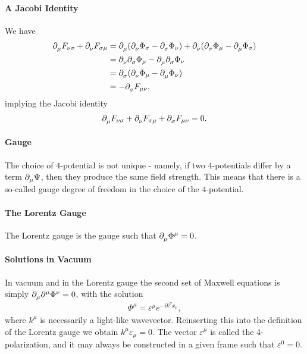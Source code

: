 \paragraph{A Jacobi Identity}
We have
\begin{align*}
	\del{\mu}{F_{\nu\sigma}} + \del{\nu}{F_{\sigma\mu}} &= \del{\mu}{(\del{\nu}{\Phi_{\sigma}} - \del{\sigma}{\Phi_{\nu}})} + \del{\nu}{(\del{\sigma}{\Phi_{\mu}} - \del{\mu}{\Phi_{\sigma}})} \\
	                                                    &= \del{\nu}{\del{\sigma}{\Phi_{\mu}}} - \del{\mu}{\del{\sigma}{\Phi_{\nu}}} \\
	                                                    &= \del{\sigma}{(\del{\nu}{\Phi_{\mu}} - \del{\mu}{\Phi_{\nu}})} \\
	                                                    &= -\del{\sigma}{F_{\mu\nu}},
\end{align*}
implying the Jacobi identity
\begin{align*}
	\del{\mu}{F_{\nu\sigma}} + \del{\nu}{F_{\sigma\mu}} + \del{\sigma}{F_{\mu\nu}} = 0.
\end{align*}

\paragraph{Gauge}
The choice of $4$-potential is not unique - namely, if two $4$-potentials differ by a term $\del{\mu}{\Psi}$, then they produce the same field strength. This means that there is a so-called gauge degree of freedom in the choice of the $4$-potential.

\paragraph{The Lorentz Gauge}
The Lorentz gauge is the gauge such that $\del{\mu}{\Phi^{\mu}} = 0$.

\paragraph{Solutions in Vacuum}
In vacuum and in the Lorentz gauge the second set of Maxwell equations is simply $\del{\mu}{\del[\mu]{}{\Phi^{\nu}}} = 0$, with the solution
\begin{align*}
	\Phi^{\mu} = \varepsilon^{\mu}e^{-ik^{\nu}x_{\nu}},
\end{align*}
where $k^{\mu}$ is necessarily a light-like wavevector. Reinserting this into the definition of the Lorentz gauge we obtain $k^{\mu}\varepsilon_{\mu} = 0$. The vector $\varepsilon^{\mu}$ is called the $4$-polarization, and it may always be constructed in a given frame such that $\varepsilon^{0} = 0$.

